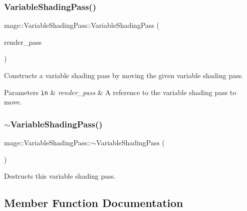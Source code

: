 \subsubsection{\texorpdfstring{Variable\+Shading\+Pass()}{VariableShadingPass()}\hspace{0.1cm}{\footnotesize\ttfamily [3/3]}}
{\footnotesize\ttfamily mage\+::\+Variable\+Shading\+Pass\+::\+Variable\+Shading\+Pass (\begin{DoxyParamCaption}\item[{\hyperlink{classmage_1_1_variable_shading_pass}{Variable\+Shading\+Pass} \&\&}]{render\+\_\+pass }\end{DoxyParamCaption})\hspace{0.3cm}{\ttfamily [default]}}

Constructs a variable shading pass by moving the given variable shading pass.


\begin{DoxyParams}[1]{Parameters}
\mbox{\tt in}  & {\em render\+\_\+pass} & A reference to the variable shading pass to move. \\
\hline
\end{DoxyParams}
\hypertarget{classmage_1_1_variable_shading_pass_a1af7915285b239e8e6d14eb0f926dc4a}{}\label{classmage_1_1_variable_shading_pass_a1af7915285b239e8e6d14eb0f926dc4a} 
\subsubsection{\texorpdfstring{$\sim$\+Variable\+Shading\+Pass()}{~VariableShadingPass()}}
{\footnotesize\ttfamily mage\+::\+Variable\+Shading\+Pass\+::$\sim$\+Variable\+Shading\+Pass (\begin{DoxyParamCaption}{ }\end{DoxyParamCaption})\hspace{0.3cm}{\ttfamily [default]}}

Destructs this variable shading pass. 

\subsection{Member Function Documentation}
\hypertarget{classmage_1_1_variable_shading_pass_a3a5bf4764bdafd393c73b75939f68aa0}{}\label{classmage_1_1_variable_shading_pass_a3a5bf4764bdafd393c73b75939f68aa0} 
